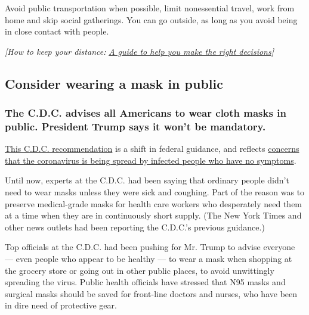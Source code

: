Avoid public transportation when possible, limit nonessential travel,
work from home and skip social gatherings. You can go outside, as long
as you avoid being in close contact with people.

\emph{{[}How to keep your distance:}
\href{https://www.nytimes3xbfgragh.onion/2020/03/19/well/live/coronavirus-quarantine-social-distancing.html}{\emph{A
guide to help you make the right decisions}}\emph{{]}}

\hypertarget{consider-wearing-a-mask-in-public}{%
\subsection{Consider wearing a mask in
public}\label{consider-wearing-a-mask-in-public}}

\hypertarget{the-cdc-advises-all-americans-to-wear-cloth-masks-in-public-president-trump-says-it-wont-be-mandatory}{%
\subsubsection{\texorpdfstring{\textbf{The C.D.C. advises all Americans
to wear cloth masks in public. President Trump says it won't be
mandatory.}}{The C.D.C. advises all Americans to wear cloth masks in public. President Trump says it won't be mandatory.}}\label{the-cdc-advises-all-americans-to-wear-cloth-masks-in-public-president-trump-says-it-wont-be-mandatory}}

\href{https://www.nytimes3xbfgragh.onion/2020/04/03/world/coronavirus-news-updates.html}{This
C.D.C. recommendation} is a shift in federal guidance, and reflects
\href{https://www.nytimes3xbfgragh.onion/2020/03/31/health/coronavirus-asymptomatic-transmission.html}{concerns
that the coronavirus is being spread by infected people who have no
symptoms}.

Until now, experts at the C.D.C. had been saying that ordinary people
didn't need to wear masks unless they were sick and coughing. Part of
the reason was to preserve medical-grade masks for health care workers
who desperately need them at a time when they are in continuously short
supply. (The New York Times and other news outlets had been reporting
the C.D.C.'s previous guidance.)

Top officials at the C.D.C. had been pushing for Mr. Trump to advise
everyone --- even people who appear to be healthy --- to wear a mask
when shopping at the grocery store or going out in other public places,
to avoid unwittingly spreading the virus. Public health officials have
stressed that N95 masks and surgical masks should be saved for
front-line doctors and nurses, who have been in dire need of protective
gear.


